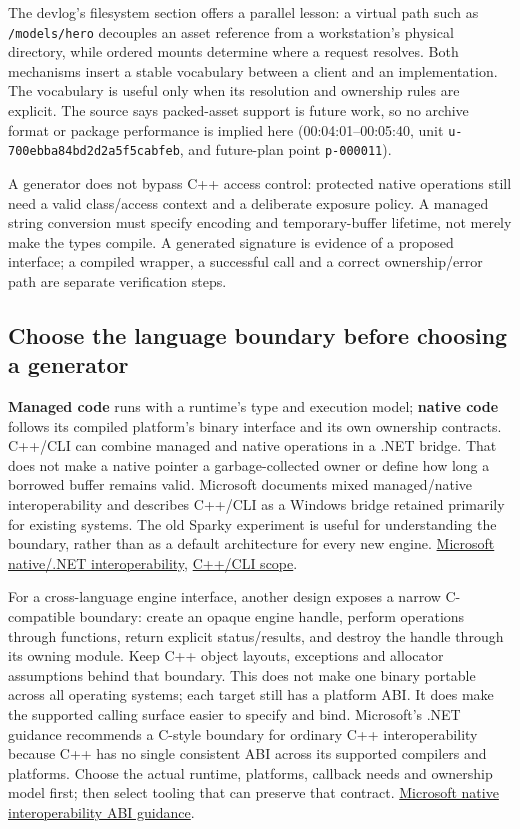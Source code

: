 The devlog's filesystem section offers a parallel lesson: a virtual path such as \texttt{/models/hero} decouples an asset reference from a workstation's physical directory, while ordered mounts determine where a request resolves. Both mechanisms insert a stable vocabulary between a client and an implementation. The vocabulary is useful only when its resolution and ownership rules are explicit. The source says packed-asset support is future work, so no archive format or package performance is implied here (00:04:01--00:05:40, unit \texttt{u-700ebba84bd2d2a5f5cabfeb}, and future-plan point \texttt{p-000011}).

A generator does not bypass C++ access control: protected native operations still need a valid class/access context and a deliberate exposure policy. A managed string conversion must specify encoding and temporary-buffer lifetime, not merely make the types compile. A generated signature is evidence of a proposed interface; a compiled wrapper, a successful call and a correct ownership/error path are separate verification steps.

\subsection{Choose the language boundary before choosing a generator}\label{05-engine-i-ch024-choose-the-language-boundary-before-choosing-a-generator}

\textbf{Managed code} runs with a runtime's type and execution model; \textbf{native code} follows its compiled platform's binary interface and its own ownership contracts. C++/CLI can combine managed and native operations in a .NET bridge. That does not make a native pointer a garbage-collected owner or define how long a borrowed buffer remains valid. Microsoft documents mixed managed/native interoperability and describes C++/CLI as a Windows bridge retained primarily for existing systems. The old Sparky experiment is useful for understanding the boundary, rather than as a default architecture for every new engine. \href{https://learn.microsoft.com/en-us/cpp/dotnet/native-and-dotnet-interoperability}{Microsoft native/.NET interoperability}, \href{https://learn.microsoft.com/en-us/cpp/dotnet/}{C++/CLI scope}.

For a cross-language engine interface, another design exposes a narrow C-compatible boundary: create an opaque engine handle, perform operations through functions, return explicit status/results, and destroy the handle through its owning module. Keep C++ object layouts, exceptions and allocator assumptions behind that boundary. This does not make one binary portable across all operating systems; each target still has a platform ABI. It does make the supported calling surface easier to specify and bind. Microsoft's .NET guidance recommends a C-style boundary for ordinary C++ interoperability because C++ has no single consistent ABI across its supported compilers and platforms. Choose the actual runtime, platforms, callback needs and ownership model first; then select tooling that can preserve that contract. \href{https://learn.microsoft.com/dotnet/standard/native-interop/abi-support}{Microsoft native interoperability ABI guidance}.

